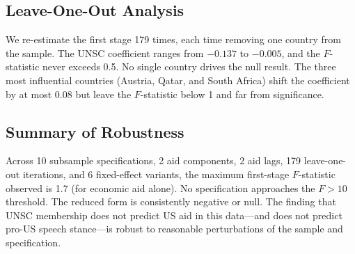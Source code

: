 \subsection{Leave-One-Out Analysis}

We re-estimate the first stage 179 times, each time removing one country from the sample. The UNSC coefficient ranges from $-0.137$ to $-0.005$, and the $F$-statistic never exceeds 0.5. No single country drives the null result. The three most influential countries (Austria, Qatar, and South Africa) shift the coefficient by at most 0.08 but leave the $F$-statistic below 1 and far from significance.

\subsection{Summary of Robustness}

Across 10 subsample specifications, 2 aid components, 2 aid lags, 179 leave-one-out iterations, and 6 fixed-effect variants, the maximum first-stage $F$-statistic observed is 1.7 (for economic aid alone). No specification approaches the $F>10$ threshold. The reduced form is consistently negative or null. The finding that UNSC membership does not predict US aid in this data---and does not predict pro-US speech stance---is robust to reasonable perturbations of the sample and specification.
